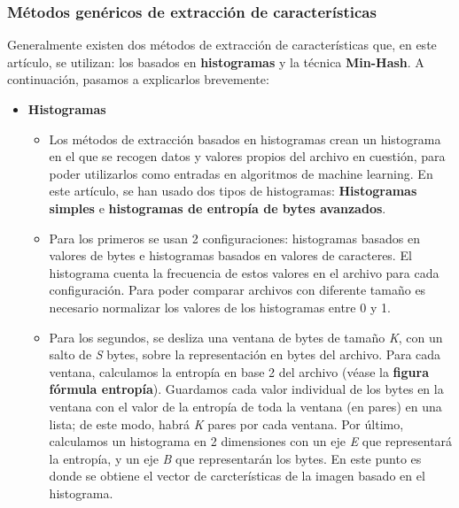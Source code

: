 
\subsubsection{Métodos genéricos de extracción de características}

Generalmente existen dos métodos de extracción de características que, en este artículo, se utilizan: los basados en \textbf{histogramas} y la técnica \textbf{Min-Hash}. A continuación, pasamos a explicarlos brevemente:

\begin{itemize}
\item \textbf{Histogramas}
\begin{itemize}
\item Los métodos de extracción basados en histogramas crean un histograma en el que se recogen datos y valores propios del archivo en cuestión, para poder utilizarlos como entradas en algoritmos de machine learning. En este artículo, se han usado dos tipos de histogramas: \textbf{Histogramas simples} e \textbf{histogramas de entropía de bytes avanzados}.
\item Para los primeros se usan 2 configuraciones: histogramas basados en valores de bytes e histogramas basados en valores de caracteres. El histograma cuenta la frecuencia de estos valores en el archivo para cada configuración. Para poder comparar archivos con diferente tamaño es necesario normalizar los valores de los histogramas entre 0 y 1.
\item Para los segundos, se desliza una ventana de bytes de tamaño \textit{K}, con un salto de \textit{S} bytes, sobre la representación en bytes del archivo. Para cada ventana, calculamos la entropía en base 2 del archivo (véase la \textbf{figura fórmula entropía}). Guardamos cada valor individual de los bytes en la ventana con el valor de la entropía de toda la ventana (en pares) en una lista; de este modo, habrá \textit{K} pares por cada ventana. Por último, calculamos un histograma en 2 dimensiones con un eje \textit{E} que representará la entropía, y un eje \textit{B} que representarán los bytes. En este punto es donde se obtiene el vector de carcterísticas de la imagen basado en el histograma.


\end{itemize}
\end{itemize}
